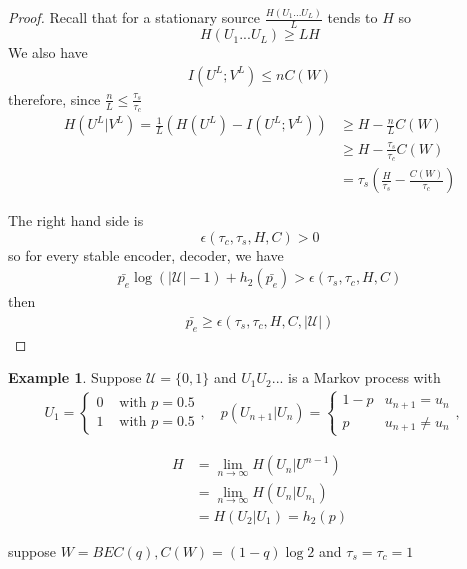 \documentclass[twoside]{article}
\theoremstyle{definition} %
\newtheorem{example}{Example}
\def\U{\mathcal{U}}
\begin{document}
\begin{proof}
  Recall that for a stationary source $\frac{H(U_1 ... U_L)}{L}$ tends to $H$ so
  $$ H(U_1 ... U_L) \geq L H$$
  We also have
  \begin{align*}
    I(U^L; V^L) \leq n C(W)
  \end{align*}
  therefore, since $\frac{n}{L} \leq \frac{\tau_s}{\tau_c}$
  \begin{align*}
    H(U^L | V^L) = \frac{1}{L} (H(U^L) - I(U^L; V^L)) &\geq H - \frac{n}{L} C(W) \\
    &\geq H - \frac{\tau_s}{\tau_c} C(W) \\
    &= \tau_s (\frac{H}{\tau_s} - \frac{C(W)}{\tau_c})
  \end{align*}

  The right hand side is
  $$\epsilon(\tau_c, \tau_s, H, C) > 0$$
  so for every stable encoder, decoder, we have
  \begin{align*}
    \bar{p_e} \log(|\U| - 1) + h_2(\bar{p_e}) > \epsilon(\tau_s, \tau_c, H, C)
  \end{align*}
  then
  \begin{align*}
    \bar{p_e} \geq \epsilon(\tau_s, \tau_c, H, C, |\U|)
  \end{align*}
\end{proof}

\begin{example}
  Suppose $\U = \{ 0, 1 \}$ and $U_1 U_2 ...$ is a Markov process with
    \begin{align*}
    U_1 =
    \left\{
    \begin{array}{ll}
      0 & \text{ with } p = 0.5 \\
      1 & \text{ with } p = 0.5
    \end{array}
    \right. , \quad
    p(U_{n+1} | U_n) =
    \left\{
    \begin{array}{ll}
      1 - p & u_{n+1} = u_n \\
      p     & u_{n+1} \neq u_n
    \end{array}
    \right. , \quad
  \end{align*}
\end{example}

\begin{align*}
  H &= \lim_{n \to \infty} H(U_n | U^{n-1})\\
    &= \lim_{n \to \infty} H(U_n | U_{n_1})\\
    &= H(U_2 | U_1) = h_2(p)
\end{align*}

suppose $W = BEC(q), C(W) = (1 - q)\log 2$ and $\tau_s = \tau_c = 1$
\end{document}
